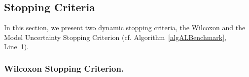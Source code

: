 \documentclass[runningheads]{llncs}
\begin{document}



\subsection{Stopping Criteria}
\label{sec:main:stopping}


In this section, we present two dynamic stopping criteria, the Wilcoxon and the Model Uncertainty Stopping Criterion (cf. Algorithm~\ref{algALBenchmark}, Line~1).

\subsubsection{Wilcoxon Stopping Criterion.}
\end{document}

